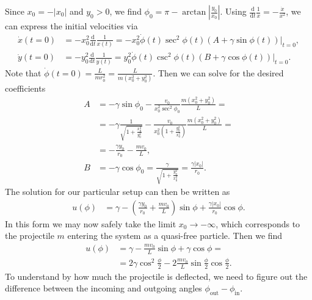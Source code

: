 \documentclass[english, parskip=full]{scrartcl}
\newcommand{\kla}{}
\newcommand{\tecxt}{}
\begin{document}
Since $x_0 = -|x_0|$ and $y_0 > 0$, we find $\phi_0 = \pi - \arctan\left\vert \frac{y_0}{x_0} \right\vert$.
Using $\frac{\tecxt\text{d}}{\tecxt\text{d}t} \frac{1}{x} = -\frac{\dot{x}}{x^2}$, we can express the initial velocities via
\begin{align}
\dot{x}(t=0) &= -x_0^2 \frac{\tecxt\text{d}}{\tecxt\text{d}t} \frac{1}{x(t)} = -x_0^2 \dot{\phi}(t) \sec^2\phi(t) \kla\left( A + \gamma\sin\phi(t) \right)  \Big\vert_{t=0}, \\
\dot{y}(t=0) &= -y_0^2 \frac{\tecxt\text{d}}{\tecxt\text{d}t} \frac{1}{y(t)} = y_0^2 \dot{\phi}(t) \csc^2\phi(t) \kla\left( B + \gamma\cos\phi(t) \right)  \Big\vert_{t=0}.
\end{align}
Note that $\dot{\phi}(t=0) = \frac{L}{mr_0^2} = \frac{L}{m(x_0^2+y_0^2)}$.
Then we can solve for the desired coefficients
\begin{align}
A &= -\gamma \sin\phi_0 - \frac{v_0}{x_0^2\sec^2\phi_0} \frac{m(x_0^2+y_0^2)}{L} = \\
&= -\gamma \frac{1}{\sqrt{1 + \frac{x_0^2}{y_0^2}}} - \frac{v_0}{x_0^2 \kla\left( 1 + \frac{y_0^2}{x_0^2} \right)} \frac{m(x_0^2 + y_0^2)}{L} = \\
&= -\frac{\gamma y_0}{r_0} - \frac{mv_0}{L},\\
B &= -\gamma\cos\phi_0 = \frac{\gamma}{\sqrt{1 + \frac{y_0^2}{x_0^2}}} = \frac{\gamma |x_0|}{r_0}.
\end{align}
The solution for our particular setup can then be written as
\begin{align}
u(\phi) &= \gamma - \kla\left( \frac{\gamma y_0}{r_0} + \frac{mv_0}{L} \right) \sin\phi + \frac{\gamma |x_0|}{r_0} \cos\phi.
\end{align}
In this form we may now safely take the limit $x_0 \rightarrow -\infty$, which corresponds to the projectile $m$ entering the system as a quasi-free particle.
Then we find
\begin{align}
u(\phi) &= \gamma - \frac{mv_0}{L}\sin\phi + \gamma \cos\phi = \\
&= 2\gamma \cos^2\frac{\phi}{2} - 2\frac{mv_0}{L} \sin\frac{\phi}{2} \cos\frac{\phi}{2}.
\end{align}
To understand by how much the projectile is deflected, we need to figure out the difference between the incoming and outgoing angles $\phi_\tecxt\text{out} - \phi_\tecxt\text{in}$.
\end{document}
